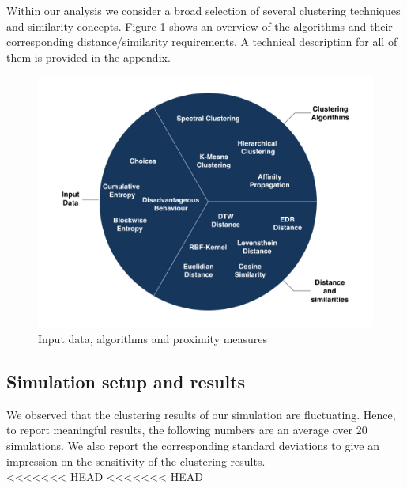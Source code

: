 \documentclass[12pt,a4paper,bibliography=totocnumbered,listof=totocnumbered]{scrartcl}
\begin{document}
Within our analysis we consider a broad selection of several clustering techniques and similarity concepts. Figure \ref{fig:cla} shows an overview of the algorithms and their corresponding distance/similarity requirements. A technical description for all of them is provided in the appendix. 

\begin{figure}[H]
	\includegraphics[width=\textwidth]{Pictures/DataClustering.jpeg}
	\caption{Input data, algorithms and proximity measures}
	\label{fig:cla}
\end{figure}

\subsection{Simulation setup and results}

We observed that the clustering results of our simulation are fluctuating. Hence, to report meaningful results, the following numbers are an average over 20 simulations. We also report the corresponding standard deviations to give an impression on the sensitivity of the clustering results.\\
<<<<<<< HEAD
<<<<<<< HEAD
\end{document}
